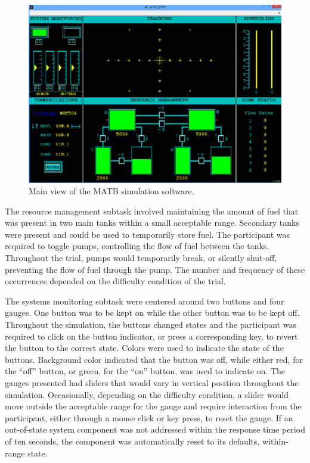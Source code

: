 \documentclass[11pt]{article}
\begin{document}
	\begin{figure}[]
	\centering
	\includegraphics[width=\linewidth]{figures/matb.png}
	\caption[Multi-Attribute Task Battery (MATB) Main View]{Main view of the MATB simulation software. }
	\label{fig:matb}
	\end{figure}
	
	The resource management subtask involved maintaining the amount of fuel that was present in two main tanks within a small acceptable range. Secondary tanks were present and could be used to temporarily store fuel. The participant was required to toggle pumps, controlling the flow of fuel between the tanks. Throughout the trial, pumps would temporarily break, or silently shut-off, preventing the flow of fuel through the pump. The number and frequency of these occurrences depended on the difficulty condition of the trial.
	
	The systems monitoring subtask were centered around two buttons and four gauges. One button was to be kept on while the other button was to be kept off. Throughout the simulation, the buttons changed states and the participant was required to click on the button indicator, or press a corresponding key, to revert the button to the correct state. Colors were used to indicate the state of the buttons. Background color indicated that the button was off, while either red, for the ``off'' button, or green, for the ``on'' button, was used to indicate on. The gauges presented had sliders that would vary in vertical position throughout the simulation. Occasionally, depending on the difficulty condition, a slider would move outside the acceptable range for the gauge and require interaction from the participant, either through a mouse click or key press, to reset the gauge. If an out-of-state system component was not addressed within the response time period of ten seconds, the component was automatically reset to its defaults, within-range state.
	
\end{document}
